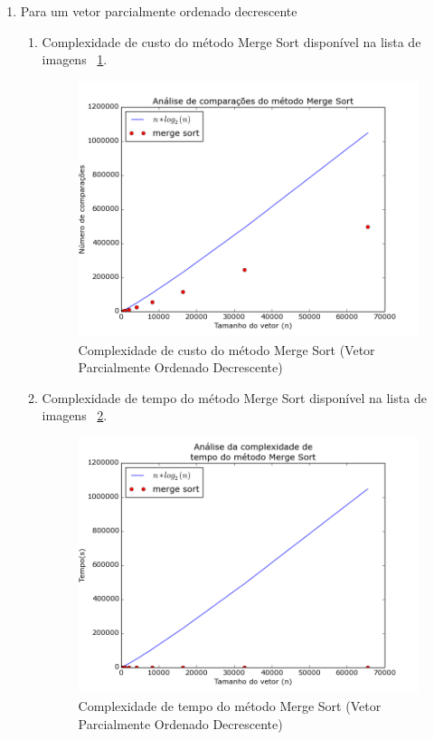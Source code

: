 \documentclass[12pt,a4paper,twoside]{report}
\begin{document}
\begin{enumerate}
\begin{enumerate}
							\end{enumerate}


			\item Para um vetor parcialmente ordenado decrescente
										\begin{enumerate}
											\item Complexidade de custo do método Merge Sort disponível na lista de imagens ~\ref{fig:MergePlot1POD}.
											\begin{figure}[!h]
												\centering
												\includegraphics[scale=0.6]{../imagens/Merge/merge_plot_1_parcialmente_ordenado_decrescente.png}
												\caption{Complexidade de custo do método Merge Sort (Vetor Parcialmente Ordenado Decrescente) \label{fig:MergePlot1POD}}
											\end{figure}


											\item Complexidade de tempo do método Merge Sort disponível na lista de imagens ~\ref{fig:MergePlot2POD}.
											\begin{figure}[!h]
												\centering
												\includegraphics[scale=0.6]{../imagens/Merge/merge_plot_2_parcialmente_ordenado_decrescente.png}
												\caption{Complexidade de tempo do método Merge Sort (Vetor Parcialmente Ordenado Decrescente) \label{fig:MergePlot2POD}}
											\end{figure}



\end{enumerate}
\end{enumerate}
\end{document}
